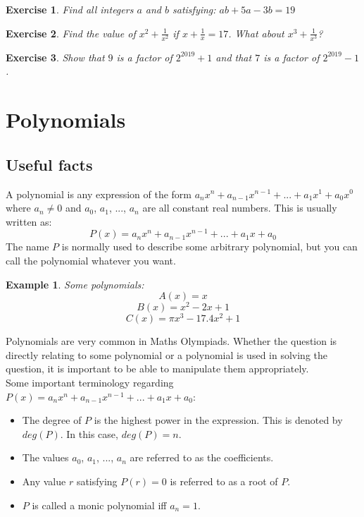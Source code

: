 \documentclass[a4paper,12pt]{article}
\newtheorem{example}{Example}[section]
\newtheorem{exercise}{Exercise}[section]
\begin{document}
\begin{exercise}
    Find all integers $a$ and $b$ satisfying: $ab + 5a - 3b = 19$
\end{exercise}

\begin{exercise}
    Find the value of $x^2 + \frac{1}{x^2}$ if $x + \frac{1}{x} = 17$. What about $x^3 + \frac{1}{x^3}$?
\end{exercise}

\begin{exercise}
    Show that $9$ is a factor of $2^{2019} + 1$ and that $7$ is a factor of $2^{2019} - 1$.
\end{exercise}

\clearpage


\section{Polynomials}

\subsection{Useful facts}

A polynomial is any expression of the form $a_nx^n + a_{n - 1}x^{n - 1} + ... + a_1x^1 + a_0x^0$ where $a_n \neq 0$ and $a_0$, $a_1$, ..., $a_n$ are all constant real numbers. This is usually written as:
$$P(x) = a_nx^n + a_{n - 1}x^{n - 1} + ... + a_1x + a_0$$
The name $P$ is normally used to describe some arbitrary polynomial, but you can call the polynomial whatever you want.

\begin{example} Some polynomials:
    $$A(x) = x$$
    $$B(x) = x^2 - 2x + 1$$
    $$C(x) = \pi x^3 - 17.4x^2 + 1$$
\end{example}

Polynomials are very common in Maths Olympiads. Whether the question is directly relating to some polynomial or a polynomial is used in solving the question, it is important to be able to manipulate them appropriately. \\

Some important terminology regarding $P(x) = a_nx^n + a_{n - 1}x^{n - 1} + ... + a_1x + a_0$:
\begin{itemize}

\item The degree of $P$ is the highest power in the expression. This is denoted by $deg(P)$. In this case, $deg(P) = n$.

\item The values $a_0$, $a_1$, ..., $a_n$ are referred to as the coefficients.

\item Any value $r$ satisfying $P(r) = 0$ is referred to as a root of $P$.

\item $P$ is called a monic polynomial iff $a_n = 1$.

\end{itemize}
\end{document}
